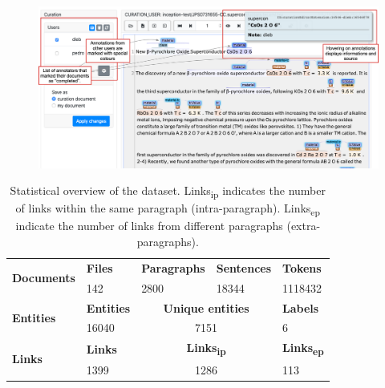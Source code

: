 \documentclass[fleqn,10pt]{wlscirep}
\begin{document}
\begin{figure}[htb]
    \centering
    \includegraphics[width=\linewidth]{inception-curation-new.png}
    \label{fig:inception-curation-interface}
\end{figure}

\begin{table}[ht]
    \centering
    \begin{tabular}{ |m{6em}  | m{4em} | m{6em} | m{7em} | m{6em} |} 
    \hline
        \multirow{2}{5em}{\textbf{Documents}} & \textbf{Files} & \textbf{Paragraphs} &	\textbf{Sentences} & \textbf{Tokens}\\
         & 142  &	2800 & 	18344 & 	1118432\\
    \hline\hline
        \multirow{2}{5em}{\textbf{Entities}} & \textbf{Entities} &  \multicolumn{2}{|c|}{\textbf{Unique entities}} &  \textbf{ Labels} \\
        & 16040 &  \multicolumn{2}{|c|}{7151} &  6 \\
    \hline\hline
        \multirow{2}{5em}{\textbf{Links}} & \textbf{Links} & \multicolumn{2}{|c|}{\textbf{Links\textsubscript{ip}}} 
        & \textbf{Links\textsubscript{ep}}\\
        & 1399  & \multicolumn{2}{|c|}{1286} &	113	\\
    \hline
    \end{tabular}
    \caption{Statistical overview of the dataset. 
    Links\textsubscript{ip} indicates the number of links within the same paragraph (intra-paragraph). Links\textsubscript{ep} indicate the number of links from different paragraphs  (extra-paragraphs).  }
    \label{table:summary-content}
\end{table}
\end{document}
